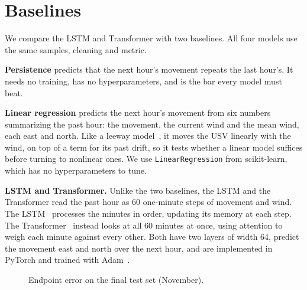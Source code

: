 \documentclass[sigconf]{acmart}
\begin{document}
\section{Baselines}

We compare the LSTM and Transformer with two baselines. All four models use the same samples, cleaning and metric.

\textbf{Persistence} predicts that the next hour's movement repeats the last hour's. It needs no training, has no hyperparameters, and is the bar every model must beat.

\textbf{Linear regression} predicts the next hour's movement from six numbers summarizing the past hour: the movement, the current wind and the mean wind, each east and north. Like a leeway model~\cite{breivik2011leeway}, it moves the USV linearly with the wind, on top of a term for its past drift, so it tests whether a linear model suffices before turning to nonlinear ones. We use \texttt{LinearRegression} from scikit-learn, which has no hyperparameters to tune.


\textbf{LSTM and Transformer.} Unlike the two baselines, the LSTM and the Transformer read the past hour as 60 one-minute steps of movement and wind. The LSTM~\cite{hochreiter1997lstm} processes the minutes in order, updating its memory at each step. The Transformer~\cite{vaswani2017attention} instead looks at all 60 minutes at once, using attention to weigh each minute against every other. Both have two layers of width 64, predict the movement east and north over the next hour, and are implemented in PyTorch and trained with Adam~\cite{kingma2015adam}.


\begin{figure}[t]
\centering
{}
\caption{Endpoint error on the final test set (November).}
\label{fig:results}
\end{figure}
\end{document}
